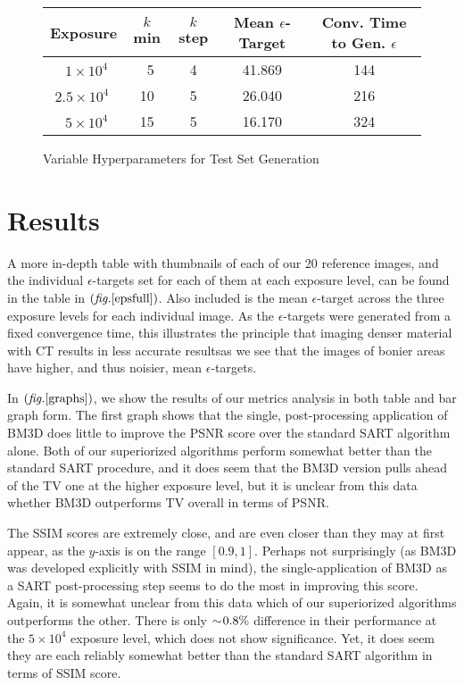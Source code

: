 \documentclass[sigconf,twocolumn,nonacm=true]{acmart}
\newcommand{\tighten}{\vspace*{-6pt plus -2pt minus -2pt}} %
\newcommand{\emd}{\text{\textemdash}} %
\newcommand{\e}[1]{\times10^{#1}} %
\newcommand{\enc}[1]{\left( #1 \right)} %
\newcommand{\eps}{\epsilon} %
\newcommand{\fig}[1]{$\enc{\textit{fig.}\ref{#1}}$}
\begin{document}
\begin{figure}[h]
\caption{Variable Hyperparameters for Test Set Generation}
\label{params}
\begin{adjustbox}{width=\linewidth}
\begin{tabular}[c]{|c||c|c|c|c|}
    \hline
    {Exposure}  &{$k$min}  &{$k$step}  &{Mean $\eps$-Target} &{Conv. Time to Gen. $\eps$} \\
    \hline\hline
    $~~1\e{4}$  &~5  &4  &41.869  &144  \\\hline
    $2.5\e{4}~$ &10  &5  &26.040  &216 \\\hline
    $~~5\e{4}$  &15  &5  &16.170  &324 \\\hline
\end{tabular}
\end{adjustbox}
\end{figure}

\medskip
\section{Results}\tighten
A more in-depth table with thumbnails of each of our 20 reference images, and the individual $\eps$-targets set for each of them at each exposure level, can be found in the table in \fig{epsfull}. Also included is the mean $\eps$-target across the three exposure levels for each individual image. As the $\eps$-targets were generated from a fixed convergence time, this illustrates the principle that imaging denser material with CT results in less accurate results\emd as we see that the images of bonier areas have higher, and thus noisier, mean $\eps$-targets.

In \fig{graphs}, we show the results of our metrics analysis in both table and bar graph form. The first graph shows that the single, post-processing application of BM3D does little to improve the PSNR score over the standard SART algorithm alone. Both of our superiorized algorithms perform somewhat better than the standard SART procedure, and it does seem that the BM3D version pulls ahead of the TV one at the higher exposure level, but it is unclear from this data whether BM3D outperforms TV overall in terms of PSNR.

The SSIM scores are extremely close, and are even closer than they may at first appear, as the $y$-axis is on the range $[0.9,1]$. Perhaps not surprisingly (as BM3D was developed explicitly with SSIM in mind), the single-application of BM3D as a SART post-processing step seems to do the most in improving this score. Again, it is somewhat unclear from this data which of our superiorized algorithms outperforms the other. There is only $\sim\hspace*{-2pt}0.8\%$ difference in their performance at the $5\e{4}$ exposure level, which does not show significance. Yet, it does seem they are each reliably somewhat better than the standard SART algorithm in terms of SSIM score.
\end{document}
